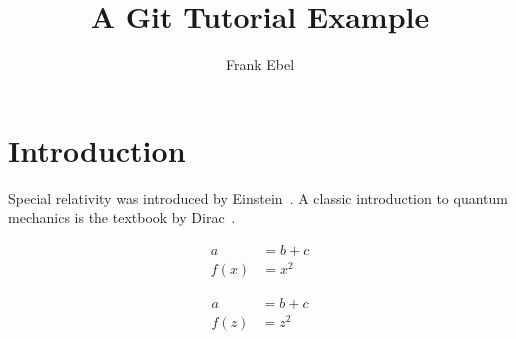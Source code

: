 \documentclass[a4paper]{article}
\title{A Git Tutorial Example}
\author{Frank Ebel}
\begin{document}
\maketitle

\section{Introduction}

Special relativity was introduced by Einstein~\cite{einstein}.
A classic introduction to quantum mechanics is the textbook by Dirac~\cite{dirac}.

\begin{align}
	a    & = b+c \\
	f(x) & = x^2
\end{align}

\begin{align}
	a    & = b+c \\
	f(z) & = z^2
\end{align}

\printbibliography
\end{document}
